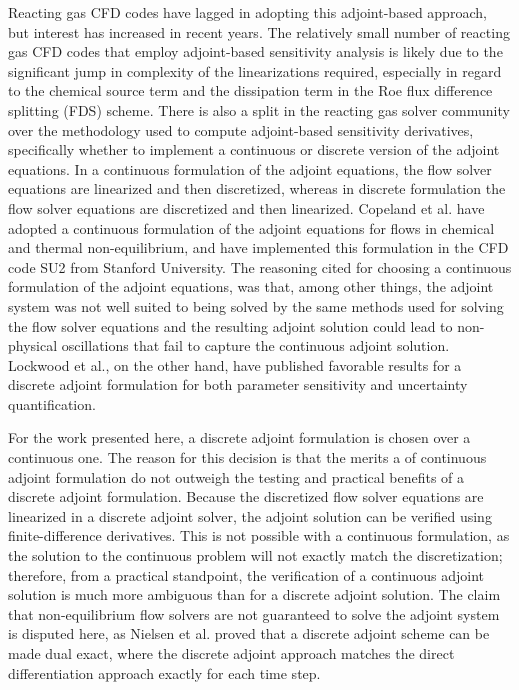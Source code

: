 Reacting gas CFD codes have lagged in adopting this adjoint-based approach, but
interest has increased in recent years\cite{Copeland, Barcelona,
lockwood2010parameter}.  The relatively small number of reacting gas CFD codes
that employ adjoint-based sensitivity analysis is likely due to the significant
jump in complexity of the linearizations required, especially in regard to the
chemical source term and the dissipation term in the Roe flux difference
splitting (FDS) scheme\cite{roe}.  There is also a split in the reacting gas
solver community over the methodology used to compute adjoint-based sensitivity
derivatives, specifically whether to implement a continuous or discrete version
of the adjoint equations.  In a continuous formulation of the adjoint equations,
the flow solver equations are linearized and then discretized, whereas in
discrete formulation the flow solver equations are discretized and then
linearized.  Copeland et al.\cite{Copeland} have adopted a continuous
formulation of the adjoint equations for flows in chemical and thermal
non-equilibrium, and have implemented this formulation in the CFD code
SU2\cite{palacios2013stanford} from Stanford University.  The reasoning cited
for choosing a continuous formulation of the adjoint equations, was that, among
other things, the adjoint system was not well suited to being solved by the same
methods used for solving the flow solver equations and the resulting adjoint
solution could lead to non-physical oscillations that fail to capture the
continuous adjoint solution.  Lockwood et al.\cite{lockwood2010uncertainty,
lockwood2010parameter}, on the other hand, have published favorable results for
a discrete adjoint formulation for both parameter sensitivity and uncertainty
quantification.

For the work presented here, a discrete adjoint formulation is chosen over a
continuous one.  The reason for this decision is that the merits a of continuous
adjoint formulation do not outweigh the testing and practical benefits of a
discrete adjoint formulation.  Because the discretized flow solver equations are
linearized in a discrete adjoint solver, the adjoint solution can be verified
using finite-difference derivatives.  This is not possible with a continuous
formulation, as the solution to the continuous problem will not exactly match
the discretization; therefore, from a practical standpoint, the verification of
a continuous adjoint solution is much more ambiguous than for a discrete adjoint
solution.  The claim that non-equilibrium flow solvers are not guaranteed to
solve the adjoint system is disputed here, as Nielsen et
al.\cite{nielsen2004implicit} proved that a discrete adjoint scheme can be made
dual exact, where the discrete adjoint approach matches the direct
differentiation approach exactly for each time step.

